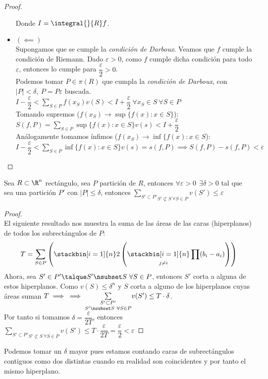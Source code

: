 \begin{teor}
\begin{proof}
\begin{itemize}
	Donde $I=\integral{}{R}f$.		
		\item $(\impliedby)$\\
		Supongamos que se cumple la \textit{condición de Darboux}. Veamos que $f$ cumple la condición de Riemann. Dado $\varepsilon>0$, como $f$ cumple dicha condición para todo $\varepsilon$, entonces lo cumple para $\dfrac{\varepsilon}{2}>0$.\\
		Podemos tomar $P\in\pi(R)$ que cumpla la \textit{condición de Darboux}, con $|P|<\delta,\ P = P\varepsilon$ buscada.\\
		$I-\dfrac{\varepsilon}{2} < \underset{S\in P}\sum f(x_S)v(S)<I+\dfrac{\varepsilon}{2}\ \forall x_S\in S\ \forall S\in P$\\
		Tomando supremos ($f(x_S) \to \sup\{f(x):x\in S\}$):\\
		$S(f,P)=\underset{S\in P}\sum \sup\{f(x):x\in S\}v(s)< I+\dfrac{\varepsilon}{2}$\\
		Análogamente tomamos ínfimos ($f(x_S) \to \inf\{f(x):x\in S$):\\
		$I-\dfrac{\varepsilon}{2} < \underset{S\in P}\sum \inf\{f(x):x\in S\}v(s)=s(f,P)\implies S(f,P)-s(f,P) < \varepsilon$
	\end{itemize}
	\end{proof}
	\end{teor}
	
	\begin{proposicion} Sea $R\subset\R^n$ rectángulo, sea $P$ partición de $R$, entonces $\forall\varepsilon>0\ \ \exists\delta>0$ tal que sea una partición $P'$ con $|P|\leq\delta$, entonces $\underset{S'\nsubset S\ \forall S\in P}{\underset{S'\subset P'}\sum}v(S')\leq \varepsilon$
	\begin{proof}\ \\
		El siguiente resultado nos muestra la suma de las áreas de las caras (hiperplanos) de todos los subrectángulos de $P$:
		\[T=\underset{S\in P}\sum\left(\stackbin[i=1]{n}2\left(\underset{j\neq i}{\stackbin[i=1]{n}\prod}(b_i-a_i)\right)\right)\]
 Ahora, sea $S'\in P'\talque S'\nsubset S\ \forall S\in P$, entonces $S'$ corta a alguna de estos hiperplanos. Como $v(S)\leq \delta^n$ y $S$ corta a alguno de los hiperplanos cuyas áreas suman $T\implies\\\implies\underset{S'\nsubset S\ \forall S\in P}{\underset{S'\subset P'}\sum}v(S')\leq T\cdot\delta$.\\
 Por tanto si tomamos $\delta = \dfrac{\varepsilon}{2T}$, entonces $\underset{S'\nsubset S\ \forall S\in P}{\underset{S'\subset P'}\sum}v(S')\leq T\cdot\dfrac{\varepsilon}{2T}=\dfrac{\varepsilon}{2}<\varepsilon$
	\end{proof}
	\begin{nota} Podemos tomar un $\delta$ mayor pues estamos contando caras de subrectángulos contiguos como dos distintas cuando en realidad son coincidentes y por tanto el mismo hiperplano.\end{nota}
	\end{proposicion}
	
